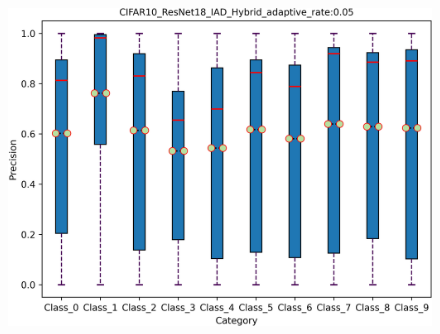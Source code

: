 \documentclass[fontset=macnew,UTF8]{article} %
\begin{document}
\begin{figure}[h!]
{\begin{minipage}[b]{.3\linewidth}
			\includegraphics[scale=0.28]{./Backdoor_detect_result/target_class/IAD.png}
		\end{minipage}
	}
	

\end{figure}
\end{document}
